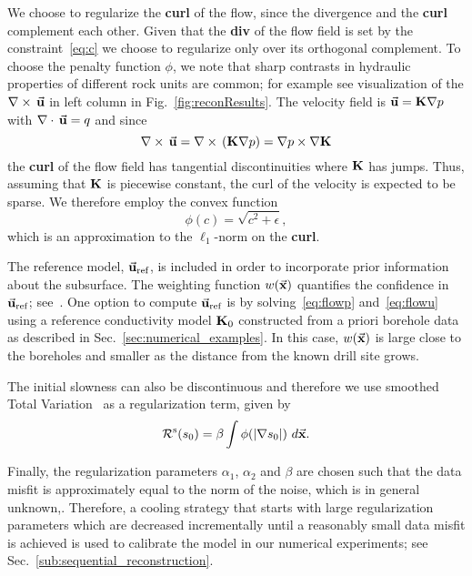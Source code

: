 \documentclass[english]{siamltex}
\newcommand {\bfK}  { {\bf K} }
\newcommand {\vu}  { {\vec {\bf  u}} }   %
\newcommand {\vuref} {\vu_{\text{ref}}}  %
\newcommand {\vx}    {\vec {\bf x}}
\renewcommand{\div}{\nabla\cdot\,}
\renewcommand{\grad}{\ensuremath {{\bf{ \nabla}}}}
\newcommand{\curl}{\ensuremath{{\nabla}\times\,}}
\newcommand{\CRflow}  {\mathcal{R}^{\text{flow}}}    %
\newcommand{\CRsat}   {\mathcal{R}^{\text{s}}}     %
\begin{document}
We choose to regularize the {\bf curl} of the flow, since the divergence and the {\bf curl} complement
each other. Given that the {\bf div} of the flow field is set by the constraint~\eqref{eq:c}
we choose to regularize only over its  orthogonal complement.
To choose the penalty function $\phi$, we note that
sharp contrasts in hydraulic properties of different rock units are common; for example see visualization of the $\curl \vu$ in left column in Fig.~\ref{fig:reconResults}.  The velocity field
is $\vu = \bfK \grad p $ with $\div \vu = q$ and since
$$ \curl \vu = \curl (\bfK \grad p) = \grad p \times \grad \bfK $$
  the {\bf curl} of the flow field 
has tangential discontinuities where $\bfK$ has jumps.
Thus, assuming that $\bfK$ is piecewise constant, the curl of the velocity 
is expected to be sparse. 
We therefore employ the convex function 
$$\phi (c)=  \sqrt{c^2 + \epsilon}, $$ 
which is an approximation to the $\ell_1$-norm on the {\bf curl}. 

The reference model, $\vuref$, is included in order to incorporate prior information about the subsurface. The weighting function $w(\vx)$ quantifies the confidence in $\vuref$; see~\cite{OldenburgPratt2007}. One option to compute $\vuref$ is by solving~\eqref{eq:flowp} and~\eqref{eq:flowu} using a reference 
conductivity model $\bfK_{0}$  constructed from a priori borehole data as described in Sec.~\ref{sec:numerical_examples}.  In this case, $w(\vx)$ is large close to the boreholes and smaller as the distance from the known drill site grows.


\bigskip

The initial slowness can also be discontinuous and therefore we use smoothed
Total Variation~\cite{ahh} as a regularization term, given by	
\begin{equation}
		\CRsat(s_0) = \beta \int  \phi(|\grad s_0|) \ d\vx.
\end{equation} 
		
Finally, the regularization parameters $\alpha_{1}$, $\alpha_{2}$ and $\beta$ are chosen such that the data misfit is approximately equal to the norm of the noise, which is in general unknown,\cite{parker}. Therefore, a cooling strategy that starts with large regularization parameters which are decreased incrementally until a reasonably small data misfit is achieved is used to calibrate the model in our numerical experiments; see Sec.~\ref{sub:sequential_reconstruction}.
\end{document}
